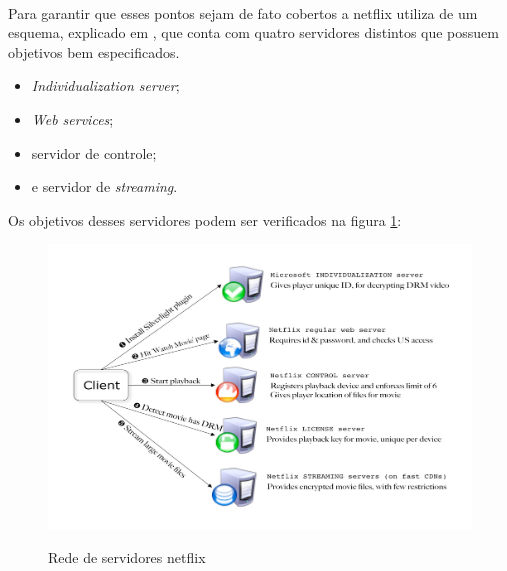 \paragraph{}
Para garantir que esses pontos sejam de fato cobertos a netflix utiliza de um esquema, explicado em \cite{pomelo2009analysis}, que conta com quatro servidores distintos que possuem objetivos bem especificados.
\begin{itemize}
\item \textit{Individualization server};
\item \textit{Web services};
\item servidor de controle;
\item e servidor de \textit{streaming}.  
\end{itemize}
Os objetivos desses servidores podem ser verificados na figura \ref{figura:servidores_netflix}:
\begin{figure}[H]
\caption{Rede de servidores netflix}
\includegraphics[width=14cm]{Figuras/servidores_netflix.png} 
\label{figura:servidores_netflix}
\end{figure}